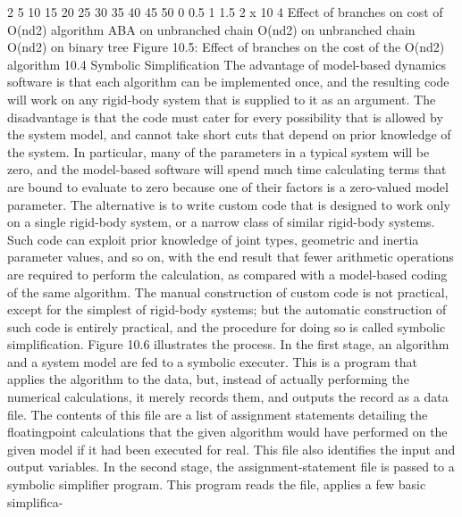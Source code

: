 2 5 10 15 20 25 30 35 40 45 50 0 0.5 1 1.5 2 x 10 4 Effect of branches on cost of O(nd2) algorithm ABA on unbranched chain O(nd2) on unbranched chain O(nd2) on binary tree Figure 10.5: Effect of branches on the cost of the O(nd2) algorithm 10.4 Symbolic Simplification The advantage of model-based dynamics software is that each algorithm can be implemented once, and the resulting code will work on any rigid-body system that is supplied to it as an argument. The disadvantage is that the code must cater for every possibility that is allowed by the system model, and cannot take short cuts that depend on prior knowledge of the system. In particular, many of the parameters in a typical system will be zero, and the model-based software will spend much time calculating terms that are bound to evaluate to zero because one of their factors is a zero-valued model parameter. The alternative is to write custom code that is designed to work only on a single rigid-body system, or a narrow class of similar rigid-body systems. Such code can exploit prior knowledge of joint types, geometric and inertia parameter values, and so on, with the end result that fewer arithmetic operations are required to perform the calculation, as compared with a model-based coding of the same algorithm. The manual construction of custom code is not practical, except for the simplest of rigid-body systems; but the automatic construction of such code is entirely practical, and the procedure for doing so is called symbolic simplification. Figure 10.6 illustrates the process. In the first stage, an algorithm and a system model are fed to a symbolic executer. This is a program that applies the algorithm to the data, but, instead of actually performing the numerical calculations, it merely records them, and outputs the record as a data file. The contents of this file are a list of assignment statements detailing the floatingpoint calculations that the given algorithm would have performed on the given model if it had been executed for real. This file also identifies the input and output variables. In the second stage, the assignment-statement file is passed to a symbolic simplifier program. This program reads the file, applies a few basic simplifica-

